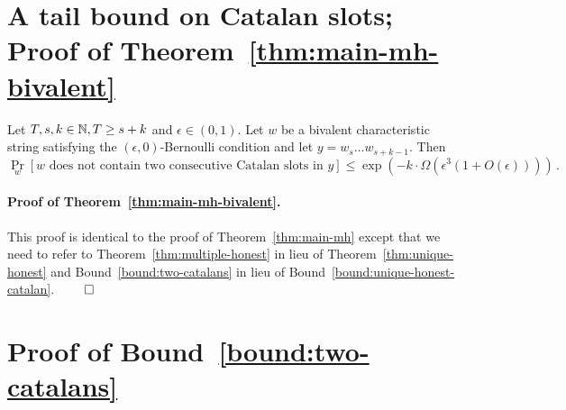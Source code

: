 \section{A tail bound on Catalan slots; Proof of Theorem~\ref{thm:main-mh-bivalent}}\label{sec:lcr-tie-bound-main-thm-proof}

  \begin{bound}\label{bound:two-catalans}
    Let $T, s, k \in \mathbb{N}, T \geq s + k$ and  $\epsilon \in (0, 1)$. 
    Let $w$ be a bivalent characteristic string satisfying 
    the $(\epsilon, 0)$-Bernoulli condition 
    and let $y = w_s \ldots w_{s+k-1}$.
    Then 
    \[
      \Pr_w[\text{$w$ does not contain two consecutive Catalan slots in $y$}]  
        \leq 
        \exp\left(
          - k\cdot \Omega(\epsilon^3(1 + O(\epsilon))) 
        \right)
        \,.
    \]
  \end{bound}

\paragraph{Proof of Theorem~\ref{thm:main-mh-bivalent}.}
  This proof is identical to the proof of Theorem~\ref{thm:main-mh} 
  except that 
  we need to refer to Theorem~\ref{thm:multiple-honest} in lieu of Theorem~\ref{thm:unique-honest}
  and Bound~\ref{bound:two-catalans} in lieu of Bound~\ref{bound:unique-honest-catalan}.
  \hfill $\qed$  


\section{Proof of \texorpdfstring{Bound~\ref{bound:two-catalans}}{the Tail Bound} }\label{sec:lcr-tie-estimates}



